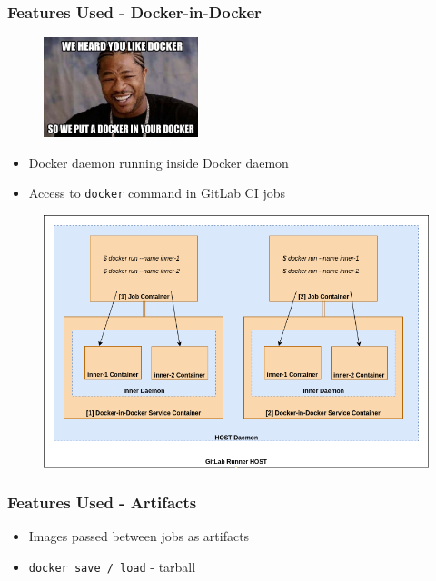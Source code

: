 \documentclass[14pt,aspectratio=169]{beamer}
\begin{document}
\begin{frame}
  \frametitle{Features Used - Docker-in-Docker}
  \begin{figure}
    \includegraphics[width=0.4\textwidth]{images/dockerindocker.jpeg}
  \end{figure}
  \begin{itemize}
    \item Docker daemon running inside Docker daemon
    \item Access to \texttt{docker} command in GitLab CI jobs
  \end{itemize}
\end{frame}

\begin{frame}[plain]
  \begin{figure}
    \includegraphics[height=\textheight]{images/dindexplanation.png}
  \end{figure}
\end{frame}

\begin{frame}
  \frametitle{Features Used - Artifacts}
  \begin{itemize}
    \item Images passed between jobs as artifacts
    \item \texttt{docker save / load} - tarball
  \end{itemize}
\end{frame}
\end{document}
